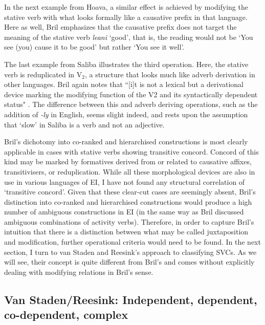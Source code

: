 In the next example from Hoava, a similar effect is achieved by modifying the stative verb with what looks formally like a causative prefix in that language. Here as well, Bril emphasizes that the causative prefix does not target the meaning of the stative verb \textit{leani} `good', that is, the reading would not be `You see (you) cause it to be good' but rather `You see it well'.

The last example from Saliba illustrates the third operation. Here, the stative verb is reduplicated in V$_2$, a structure that looks much like adverb derivation in other languages. Bril again notes that ``[i]t is not a lexical but a derivational device marking the modifying function of the V2 and its syntactically dependent status" \citep[273]{bril2007nexus}. The difference between this and adverb deriving operations, such as the addition of \textit{-ly} in English, seems slight indeed, and rests upon the assumption that `slow' in Saliba is a verb and not an adjective.

Bril's dichotomy into co-ranked and hierarchised constructions is most clearly applicable in cases with stative verbs showing transitive concord. Concord of this kind may be marked by formatives derived from or related to causative affixes, transitivisers, or reduplication. While all these morphological devices are also in use in various languages of EI, I have not found any structural correlation of `transitive concord'. Given that these clear-cut cases are seemingly absent, Bril's distinction into co-ranked and hierarchised constructions would produce a high number of ambiguous constructions in EI (in the same way as Bril discussed ambiguous combinations of activity verbs). Therefore, in order to capture Bril's intuition that there is a distinction between what may be called juxtaposition and modification, further operational criteria would need to be found. In the next section, I turn to van Staden and Reesink's approach to classifying SVCs. As we will see, their concept is quite different from Bril's and comes without explicitly dealing with modifying relations in Bril's sense.

\subsection[Van Staden/Reesink: Independent, dependent, ...]{Van Staden/Reesink: Independent, dependent, co-dependent, complex%
}

